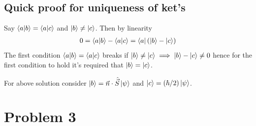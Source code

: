 \documentclass[letter, 10pts]{article}
\newcommand{\hb}{\hbar}
\begin{document}
\subsection*{Quick proof for uniqueness of ket's} 
Say $\braket{a | b} = \braket{a  | c}$ and $\ket{b} \neq \ket{c}$. Then by linearity 
\begin{align*} 0 =
	\braket{a | b} - \braket{a | c} &= \bra{a} \left(\ket{b} - \ket{c}\right) \\
\end{align*}
The first condition $\braket{a | b} = \braket{a | c}$ breaks if $\ket{b} \neq \ket{c} \implies \ket{b} - \ket{c} \neq 0 $ hence for the first condition to hold it's required that $\ket{b } = \ket{c}$. 

For above solution consider $\ket{b} = \vec{n} \cdot \hat{\vec{S}} \ket{\psi}$ and $\ket{c} = (\hb / 2) \ket{\psi}$.



\section*{Problem 3} 
\end{document}
